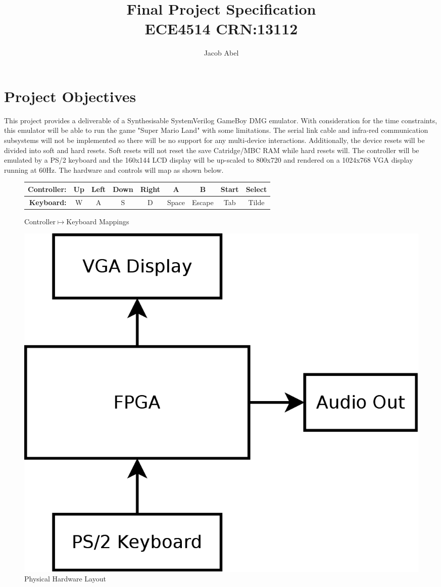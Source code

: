 \documentclass[12pt,letterpaper,titlepage, final]{report}
\author{Jacob Abel}
\title{	Final Project Specification
	\\\large ECE4514 CRN:13112
}
\begin{document}
\maketitle
\begin{raggedright}
\hypertarget{projobj}{\section{Project Objectives}}

This project provides a deliverable of a Synthesisable SystemVerilog GameBoy DMG emulator. With consideration for the time constraints, this emulator will be able to run the game "Super Mario Land" with some limitations. The serial link cable and infra-red communication subsystems will not be implemented so there will be no support for any multi-device interactions. Additionally, the device resets will be divided into soft and hard resets. Soft resets will not reset the save Catridge/MBC RAM while hard resets will. The controller will be emulated by a PS/2 keyboard and the 160x144 LCD display will be up-scaled to 800x720 and rendered on a 1024x768 VGA display running at 60Hz. The hardware and controls will map as shown below.
\vfill
\begin{figure}[ht]
\centering
\begin{tabular}{|r|c|c|c|c|c|c|c|c|}
\hline 
\textbf{Controller:} & Up & Left & Down & Right & A & B & Start & Select \\ 
\hline 
\textbf{Keyboard:} & W & A & S & D & Space & Escape & Tab & Tilde \\ 
\hline 
\end{tabular} 
\hypertarget{fig1}{\caption{Controller$\mapsto$Keyboard Mappings}}
\end{figure}
\vspace{2\baselineskip}
\begin{figure}[ht]
\centering
\includegraphics[width=\textwidth, height=20\baselineskip, keepaspectratio=true]{GB_Dia}
\hypertarget{fig2}{\caption{Physical Hardware Layout}}
\end{figure}



\end{raggedright}
\end{document}
